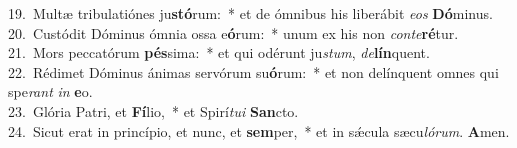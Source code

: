 {19.~}Multæ tribulatiónes ju\textbf{stó}rum:~* et de ómnibus his liberábit \textit{e}\textit{os} \textbf{Dó}minus.\\
{20.~}Custódit Dóminus ómnia ossa e\textbf{ó}rum:~* unum ex his non \textit{con}\textit{te}\textbf{ré}tur.\\
{21.~}Mors peccatórum \textbf{pés}sima:~* et qui odérunt ju\textit{stum}, \textit{de}\textbf{lín}quent.\\
{22.~}Rédimet Dóminus ánimas servórum su\textbf{ó}rum:~* et non delínquent omnes qui spe\textit{rant} \textit{in} \textbf{e}o.\\
{23.~}Glória Patri, et \textbf{Fí}lio,~* et Spirí\textit{tu}\textit{i} \textbf{San}cto.\\
{24.~}Sicut erat in princípio, et nunc, et \textbf{sem}per,~* et in sǽcula sæcu\textit{ló}\textit{rum}. \textbf{A}men.\\
